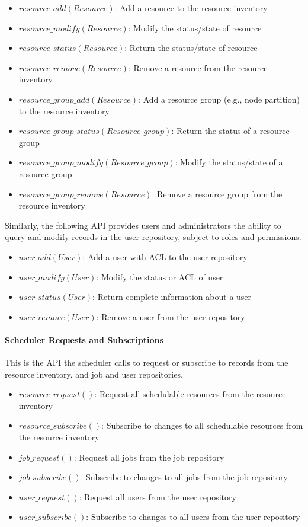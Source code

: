 \begin{itemize}
\item{$resource\_add(Resource)$: Add a resource to the resource inventory}
\item{$resource\_modify(Resource)$: Modify the status/state of resource}
\item{$resource\_status(Resource)$: Return the status/state of resource}
\item{$resource\_remove(Resource)$: Remove a resource from the resource inventory}
\item{$resource\_group\_add(Resource)$: Add a resource group (e.g., node partition) to the resource inventory}
\item{$resource\_group\_status(Resource\_group)$: Return the status of a resource group}
\item{$resource\_group\_modify(Resource\_group)$: Modify the status/state of a resource group}
\item{$resource\_group\_remove(Resource)$: Remove a resource group from the resource inventory}
\end{itemize}

Similarly, the following API provides users and administrators the
ability to query and modify records in the user repository, subject to
roles and permissions.

\begin{itemize}
\item{$user\_add(User)$: Add a user with ACL to the user repository}
\item{$user\_modify(User)$: Modify the status or ACL of user}
\item{$user\_status(User)$: Return complete information about a user}
\item{$user\_remove(User)$: Remove a user from the user repository}
\end{itemize}

\paragraph{Scheduler Requests and Subscriptions}
This is the API the scheduler calls to request or subscribe to records
from the resource inventory, and job and user repositories.

\begin{itemize}
\item{$resource\_request()$: Request all schedulable resources from
  the resource inventory}
\item{$resource\_subscribe()$: Subscribe to changes to all schedulable
  resources from the resource inventory}
\item{$job\_request()$: Request all jobs from the job repository}
\item{$job\_subscribe()$: Subscribe to changes to all jobs from the
  job repository}
\item{$user\_request()$: Request all users from the user repository}
\item{$user\_subscribe()$: Subscribe to changes to all users from the
  user repository}
\end{itemize}

